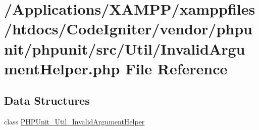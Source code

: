 \hypertarget{_invalid_argument_helper_8php}{}\section{/\+Applications/\+X\+A\+M\+P\+P/xamppfiles/htdocs/\+Code\+Igniter/vendor/phpunit/phpunit/src/\+Util/\+Invalid\+Argument\+Helper.php File Reference}
\label{_invalid_argument_helper_8php}
\subsection*{Data Structures}
\begin{DoxyCompactItemize}
\item 
class \mbox{\hyperlink{class_p_h_p_unit___util___invalid_argument_helper}{P\+H\+P\+Unit\+\_\+\+Util\+\_\+\+Invalid\+Argument\+Helper}}
\end{DoxyCompactItemize}
